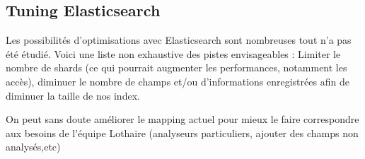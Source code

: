 \subsection{Tuning Elasticsearch}
Les possibilités d'optimisations avec Elasticsearch sont nombreuses tout n'a pas été
étudié. Voici une liste non exhaustive des pistes envisageables : Limiter le nombre de shards (ce qui pourrait
augmenter les performances, notamment les accès), diminuer le nombre de champs et/ou 
d'informations enregistrées afin de diminuer la taille de nos index.

On peut sans doute améliorer le mapping actuel pour mieux le faire correspondre aux
besoins de l'équipe Lothaire (analyseurs particuliers, ajouter des champs non analysés,etc)


%
